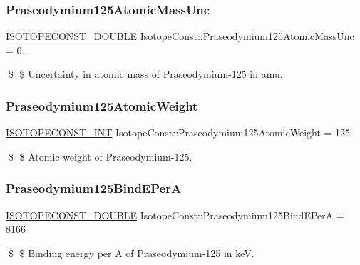\subsubsection{\texorpdfstring{Praseodymium125\+Atomic\+Mass\+Unc}{Praseodymium125AtomicMassUnc}}
{\footnotesize\ttfamily \mbox{\hyperlink{group___isotope_const-_macros_ga8f45a7272ce02c0b4c65c44636ed719a}{I\+S\+O\+T\+O\+P\+E\+C\+O\+N\+S\+T\+\_\+\+D\+O\+U\+B\+LE}} Isotope\+Const\+::\+Praseodymium125\+Atomic\+Mass\+Unc = 0.}

\$ \$ Uncertainty in atomic mass of Praseodymium-\/125 in amu. \mbox{\label{group___isotope_const-_praseodymium-_pr125_ga48c7c156c8aaf66d99710d3a0c89776e}} 
\subsubsection{\texorpdfstring{Praseodymium125\+Atomic\+Weight}{Praseodymium125AtomicWeight}}
{\footnotesize\ttfamily \mbox{\hyperlink{group___isotope_const-_macros_ga5f18360b3e99483a35c32d789e62621c}{I\+S\+O\+T\+O\+P\+E\+C\+O\+N\+S\+T\+\_\+\+I\+NT}} Isotope\+Const\+::\+Praseodymium125\+Atomic\+Weight = 125}

\$ \$ Atomic weight of Praseodymium-\/125. \mbox{\label{group___isotope_const-_praseodymium-_pr125_ga257e5fbbf936607d70490360645228a5}} 
\subsubsection{\texorpdfstring{Praseodymium125\+Bind\+E\+PerA}{Praseodymium125BindEPerA}}
{\footnotesize\ttfamily \mbox{\hyperlink{group___isotope_const-_macros_ga8f45a7272ce02c0b4c65c44636ed719a}{I\+S\+O\+T\+O\+P\+E\+C\+O\+N\+S\+T\+\_\+\+D\+O\+U\+B\+LE}} Isotope\+Const\+::\+Praseodymium125\+Bind\+E\+PerA = 8166}

\$ \$ Binding energy per A of Praseodymium-\/125 in keV. \mbox{\label{group___isotope_const-_praseodymium-_pr125_ga61feaa3b80ebf348c72a020e29b487af}} 

